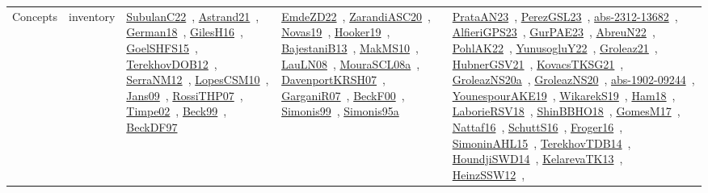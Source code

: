 {\begin{longtable}{lp{3cm}>{\raggedright\arraybackslash}p{6cm}>{\raggedright\arraybackslash}p{6cm}>{\raggedright\arraybackslash}p{8cm}}
Concepts & inventory & \href{works/SubulanC22.pdf}{SubulanC22}~\cite{SubulanC22}, \href{works/Astrand21.pdf}{Astrand21}~\cite{Astrand21}, \href{works/German18.pdf}{German18}~\cite{German18}, \href{works/GilesH16.pdf}{GilesH16}~\cite{GilesH16}, \href{works/GoelSHFS15.pdf}{GoelSHFS15}~\cite{GoelSHFS15}, \href{works/TerekhovDOB12.pdf}{TerekhovDOB12}~\cite{TerekhovDOB12}, \href{works/SerraNM12.pdf}{SerraNM12}~\cite{SerraNM12}, \href{works/LopesCSM10.pdf}{LopesCSM10}~\cite{LopesCSM10}, \href{works/Jans09.pdf}{Jans09}~\cite{Jans09}, \href{works/RossiTHP07.pdf}{RossiTHP07}~\cite{RossiTHP07}, \href{works/Timpe02.pdf}{Timpe02}~\cite{Timpe02}, \href{works/Beck99.pdf}{Beck99}~\cite{Beck99}, \href{works/BeckDF97.pdf}{BeckDF97}~\cite{BeckDF97} & \href{works/EmdeZD22.pdf}{EmdeZD22}~\cite{EmdeZD22}, \href{works/ZarandiASC20.pdf}{ZarandiASC20}~\cite{ZarandiASC20}, \href{works/Novas19.pdf}{Novas19}~\cite{Novas19}, \href{works/Hooker19.pdf}{Hooker19}~\cite{Hooker19}, \href{works/BajestaniB13.pdf}{BajestaniB13}~\cite{BajestaniB13}, \href{works/MakMS10.pdf}{MakMS10}~\cite{MakMS10}, \href{works/LauLN08.pdf}{LauLN08}~\cite{LauLN08}, \href{works/MouraSCL08a.pdf}{MouraSCL08a}~\cite{MouraSCL08a}, \href{works/DavenportKRSH07.pdf}{DavenportKRSH07}~\cite{DavenportKRSH07}, \href{works/GarganiR07.pdf}{GarganiR07}~\cite{GarganiR07}, \href{works/BeckF00.pdf}{BeckF00}~\cite{BeckF00}, \href{works/Simonis99.pdf}{Simonis99}~\cite{Simonis99}, \href{works/Simonis95a.pdf}{Simonis95a}~\cite{Simonis95a} & \href{works/PrataAN23.pdf}{PrataAN23}~\cite{PrataAN23}, \href{works/PerezGSL23.pdf}{PerezGSL23}~\cite{PerezGSL23}, \href{works/abs-2312-13682.pdf}{abs-2312-13682}~\cite{abs-2312-13682}, \href{works/AlfieriGPS23.pdf}{AlfieriGPS23}~\cite{AlfieriGPS23}, \href{works/GurPAE23.pdf}{GurPAE23}~\cite{GurPAE23}, \href{works/AbreuN22.pdf}{AbreuN22}~\cite{AbreuN22}, \href{works/PohlAK22.pdf}{PohlAK22}~\cite{PohlAK22}, \href{works/YunusogluY22.pdf}{YunusogluY22}~\cite{YunusogluY22}, \href{works/Groleaz21.pdf}{Groleaz21}~\cite{Groleaz21}, \href{works/HubnerGSV21.pdf}{HubnerGSV21}~\cite{HubnerGSV21}, \href{works/KovacsTKSG21.pdf}{KovacsTKSG21}~\cite{KovacsTKSG21}, \href{works/GroleazNS20a.pdf}{GroleazNS20a}~\cite{GroleazNS20a}, \href{works/GroleazNS20.pdf}{GroleazNS20}~\cite{GroleazNS20}, \href{works/abs-1902-09244.pdf}{abs-1902-09244}~\cite{abs-1902-09244}, \href{works/YounespourAKE19.pdf}{YounespourAKE19}~\cite{YounespourAKE19}, \href{works/WikarekS19.pdf}{WikarekS19}~\cite{WikarekS19}, \href{works/Ham18.pdf}{Ham18}~\cite{Ham18}, \href{works/LaborieRSV18.pdf}{LaborieRSV18}~\cite{LaborieRSV18}, \href{works/ShinBBHO18.pdf}{ShinBBHO18}~\cite{ShinBBHO18}, \href{works/GomesM17.pdf}{GomesM17}~\cite{GomesM17}, \href{works/Nattaf16.pdf}{Nattaf16}~\cite{Nattaf16}, \href{works/SchuttS16.pdf}{SchuttS16}~\cite{SchuttS16}, \href{works/Froger16.pdf}{Froger16}~\cite{Froger16}, \href{works/SimoninAHL15.pdf}{SimoninAHL15}~\cite{SimoninAHL15}, \href{works/TerekhovTDB14.pdf}{TerekhovTDB14}~\cite{TerekhovTDB14}, \href{works/HoundjiSWD14.pdf}{HoundjiSWD14}~\cite{HoundjiSWD14}, \href{works/KelarevaTK13.pdf}{KelarevaTK13}~\cite{KelarevaTK13}, \href{works/HeinzSSW12.pdf}{HeinzSSW12}~\cite{HeinzSSW12}, 
\end{longtable}}
